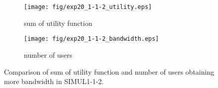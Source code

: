 	\begin{figure}
		\begin{center}
			\begin{subfigure}[b]{0.8\textwidth}
				\centering
				\texttt{[image: fig/exp20\_1-1-2\_utility.eps]}
				\caption{sum of utility function}
				\label{figure:simul1_1_2_u_a}
			\end{subfigure}
			\begin{subfigure}[b]{0.8\textwidth}
				\centering
				\texttt{[image: fig/exp20\_1-1-2\_bandwidth.eps]}
				\caption{number of users}
				\label{figure:simul1_1_2_u_b}
			\end{subfigure}
			\caption{Comparison of sum of utility function and number of users obtaining more bandwidth in SIMUL1-1-2.}
			\label{figure:simul1_1_2_u}
		\end{center}
	\end{figure}

\clearpage

